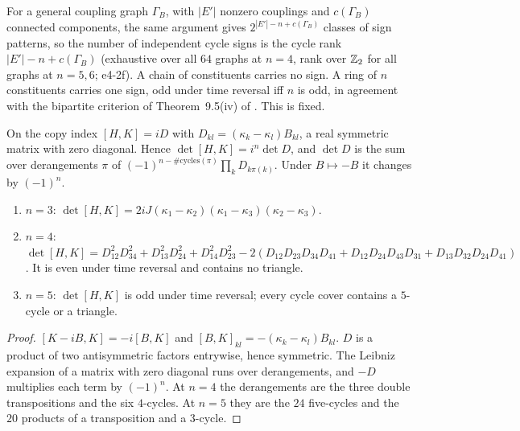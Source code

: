 \begin{remark}
\label{e4:rem:graphs}
For a general coupling graph $\Gamma_B$, with $|E'|$ nonzero couplings and $c(\Gamma_B)$ connected components, the same argument gives
$2^{|E'|-n+c(\Gamma_B)}$ classes of sign patterns, so the number of independent cycle signs is the cycle rank $|E'|-n+c(\Gamma_B)$ (exhaustive over all
$64$ graphs at $n=4$, rank over $\mathbb{Z}_2$ for all graphs at $n=5,6$; e4-2f). A chain of constituents carries no sign. A ring of $n$ constituents
carries one sign, odd under time reversal iff $n$ is odd, in agreement with the bipartite criterion of Theorem~9.5(iv) of \cite{RE}. This is fixed.
\end{remark}

\begin{proposition}
\label{e4:prop:jarlskog}
On the copy index $[H,K]=iD$ with $D_{kl}=(\kappa_k-\kappa_l)B_{kl}$, a real symmetric matrix with zero diagonal. Hence $\det[H,K]=i^n\det D$, and
$\det D$ is the sum over derangements $\pi$ of $(-1)^{n-\#\text{cycles}(\pi)}\prod_kD_{k\pi(k)}$. Under $B\mapsto-B$ it changes by $(-1)^n$.
\begin{enumerate}[label=(\roman*),leftmargin=2.2em]
\item $n=3$: $\det[H,K]=2iJ(\kappa_1-\kappa_2)(\kappa_1-\kappa_3)(\kappa_2-\kappa_3)$.
\item $n=4$: $\det[H,K]=D_{12}^2D_{34}^2+D_{13}^2D_{24}^2+D_{14}^2D_{23}^2-2(D_{12}D_{23}D_{34}D_{41}+D_{12}D_{24}D_{43}D_{31}+D_{13}D_{32}D_{24}D_{41})$. It is even
under time reversal and contains no triangle.
\item $n=5$: $\det[H,K]$ is odd under time reversal; every cycle cover contains a $5$-cycle or a triangle.
\end{enumerate}
\end{proposition}

\begin{proof}
$[K-iB,K]=-i[B,K]$ and $[B,K]_{kl}=-(\kappa_k-\kappa_l)B_{kl}$. $D$ is a product of two antisymmetric factors entrywise, hence symmetric. The Leibniz
expansion of a matrix with zero diagonal runs over derangements, and $-D$ multiplies each term by $(-1)^n$. At $n=4$ the derangements are the three
double transpositions and the six $4$-cycles. At $n=5$ they are the $24$ five-cycles and the $20$ products of a transposition and a $3$-cycle.
\end{proof}

